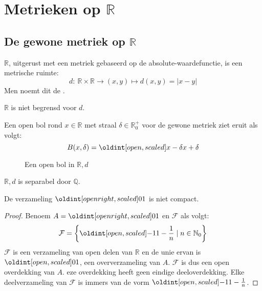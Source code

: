 \documentclass[main.tex]{subfiles}
\begin{document}
\section{Metrieken op $\mathbb{R}$}
\label{sec:metrieken-op-mathbbr}

\subsection{De gewone metriek op $\mathbb{R}$}
\label{sec:de-gewone-metriek}

\begin{vb}
  $\mathbb{R}$, uitgerust met een metriek gebaseerd op de absolute-waardefunctie, is een metrische ruimte:
  \[ d:\ \mathbb{R}\times\mathbb{R}\rightarrow (x,y) \mapsto d(x,y)=|x-y| \]
  Men noemt dit de .
\end{vb}

\begin{opm}
  $\mathbb{R}$ is niet begrensd voor $d$.
\end{opm}

\begin{vb}
  Een open bol rond $x\in \mathbb{R}$ met straal $\delta\in \mathbb{R}_{0}^{+}$ voor de gewone metriek ziet eruit als volgt:
  \[ B(x,\delta) = \interval[open]{x-\delta}{x+\delta} \]
  \begin{figure}[H]
    \centering
    \caption{Een open bol in $\mathbb{R},d$}
  \end{figure}
\end{vb}

\begin{vb}
  $\mathbb{R},d$ is separabel door $\mathbb{Q}$.
\end{vb}

\begin{vb}
  De verzameling $\interval[open right]{0}{1}$ is niet compact.
  \begin{proof}
    Benoem $A = \interval[open right]{0}{1}$ en $\mathcal{F}$ als volgt:
    \[ \mathcal{F} = \left\{      \interval[open]{-1}{1-\frac{1}{n}} \mid n \in \mathbb{N}_{0} \right\} \]
    $\mathcal{F}$ is een verzameling van open delen van $\mathbb{R}$ en de unie ervan is $\interval[open]{0}{1}$, een oververzameling van $A$.
    $\mathcal{F}$ is dus een open overdekking van $A$.
    eze overdekking heeft geen eindige deeloverdekking.
    Elke deelverzameling van $\mathcal{F}$ is immers van de vorm $\interval[open]{-1}{1-\frac{1}{n}}$.
  \end{proof}
\end{vb}
\end{document}
